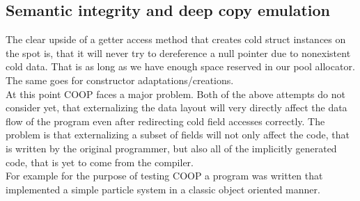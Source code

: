 \subsection{Semantic integrity and deep copy emulation}\label{deep_copy_emulation}
The clear upside of a getter access method that creates cold struct instances on the spot is, that it will never try to dereference a null pointer due to nonexistent cold data. That is as long as we have enough space reserved in our pool allocator. The same goes for constructor adaptations/creations.\\
At this point COOP faces a major problem. Both of the above attempts do not consider yet, that externalizing the data layout will very directly affect the data flow of the program even after redirecting cold field accesses correctly. The problem is that externalizing a subset of fields will not only affect the code, that is written by the original programmer, but also all of the implicitly generated code, that is yet to come from the compiler.\\
For example for the purpose of testing COOP a program was written that implemented a simple particle system in a classic object oriented manner.
